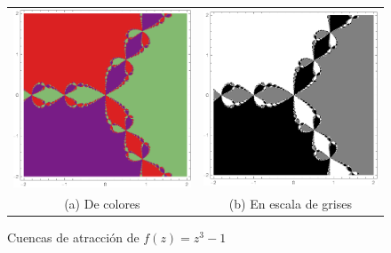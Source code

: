 \begin{figure}[h]
    \begin{tabular}{cc}
      \includegraphics[scale=0.5]{./img/cuencas-2.png} &   \includegraphics[scale=0.5]{./img/cuencas-3.png} \\
    (a) De colores & (b) En escala de grises \\[6pt]
    \end{tabular}
    \caption{Cuencas de atracción de $f(z)=z^3-1$}
    \label{fig:cuencas-2}
\end{figure}

